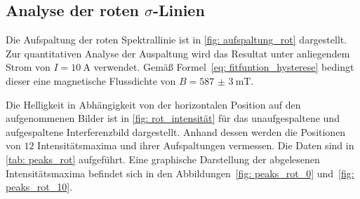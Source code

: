\subsection{Analyse der roten $\sigma$-Linien}
Die Aufspaltung der roten Spektrallinie ist in \autoref{fig: aufspaltung_rot} dargestellt. Zur quantitativen Analyse der Auspaltung wird das
Resultat unter anliegendem Strom von $I = \SI{10}{\ampere}$ verwendet. Gemäß Formel~\eqref{eq: fitfuntion_hysterese} bedingt dieser
eine magnetische Flussdichte von $B = \SI{587(3)}{\milli\tesla}$.

Die Helligkeit in Abhängigkeit von der horizontalen Position auf den aufgenommenen Bilder ist in \autoref{fig: rot_intensität} für das unaufgespaltene
und aufgespaltene Interferenzbild dargestellt. Anhand dessen werden die Positionen von $12$ Intensitätsmaxima und ihrer Aufspaltungen
vermessen. Die Daten sind in \autoref{tab: peaks_rot} aufgeführt. Eine graphische Darstellung der abgelesenen Intensitätsmaxima befindet sich in
den Abbildungen~\ref{fig: peaks_rot_0} und~\ref{fig: peaks_rot_10}.

